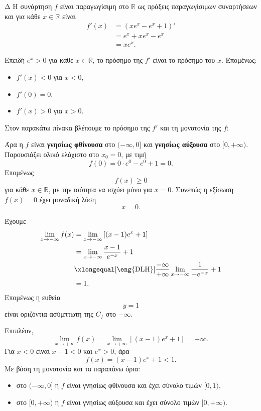 \begin{thema}{Δ}
Η συνάρτηση $f$ είναι παραγωγίσιμη στο $\mathbb{R}$ ως πράξεις παραγωγίσιμων συναρτήσεων και για κάθε $x\in\mathbb{R}$ είναι
\begin{align*}
f'(x)
&=(xe^x-e^x+1)'\\
&=e^x+xe^x-e^x\\
&=xe^x.
\end{align*}
\begin{erwthma}
\item Επειδή $e^x>0$ για κάθε $x\in\mathbb{R}$, το πρόσημο της $f'$ είναι το πρόσημο του $x$. Επομένως:
\begin{itemize}
\item $f'(x)<0$ για $x<0$,
\item $f'(0)=0$,
\item $f'(x)>0$ για $x>0$.
\end{itemize}
Στον παρακάτω πίνακα βλέπουμε το πρόσημο της $f'$ και τη μονοτονία της $f$:
\begin{center}
\end{center}

Άρα η $f$ είναι \textbf{γνησίως φθίνουσα} στο $(-\infty,0]$ και \textbf{γνησίως αύξουσα} στο $[0,+\infty)$. Παρουσιάζει ολικό ελάχιστο στο $x_0=0$, με τιμή
\[
f(0)=0\cdot e^0-e^0+1=0.
\]
Επομένως
\[
f(x)\geq0
\]
για κάθε $x\in\mathbb{R}$, με την ισότητα να ισχύει μόνο για $x=0$. Συνεπώς η εξίσωση $f(x)=0$ έχει μοναδική λύση
\[
{x=0}.
\]

\item Έχουμε
\begin{align*}
\lim_{x\to-\infty}f(x)
&=\lim_{x\to-\infty}\left[(x-1)e^x+1\right]\\
&=\lim_{x\to-\infty}\frac{x-1}{e^{-x}}+1\\
&\xlongequal[\text{\eng{DLH}}]{\frac{-\infty}{+\infty}}
\lim_{x\to-\infty}\frac{1}{-e^{-x}}+1\\
&=1.
\end{align*}
Επομένως η ευθεία
\[
{y=1}
\]
είναι οριζόντια ασύμπτωτη της $C_f$ στο $-\infty$.

Επιπλέον,
\[
\lim_{x\to+\infty}f(x)
=\lim_{x\to+\infty}\left[(x-1)e^x+1\right]
=+\infty.
\]
Για $x<0$ είναι $x-1<0$ και $e^x>0$, άρα
\[
f(x)=(x-1)e^x+1<1.
\]
Με βάση τη μονοτονία και τα παραπάνω όρια:
\begin{itemize}
\item στο $(-\infty,0]$ η $f$ είναι γνησίως φθίνουσα και έχει σύνολο τιμών $[0,1)$,
\item στο $[0,+\infty)$ η $f$ είναι γνησίως αύξουσα και έχει σύνολο τιμών $[0,+\infty)$.
\end{itemize}


\end{erwthma}
\end{thema}
